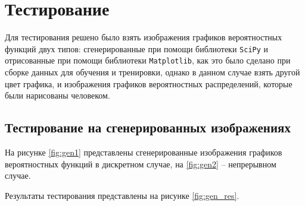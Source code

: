 \documentclass[14pt, russian]{scrartcl}
\begin{document}
\section{Тестирование}

Для тестирования решено было взять изображения графиков вероятностных функций двух типов: сгенерированные при помощи библиотеки \verb|SciPy| и отрисованные при помощи библиотеки \verb|Matplotlib|, как это было сделано при сборке данных для обучения и тренировки, однако в данном случае взять другой цвет графика, и изображения графиков вероятностных распределений, которые были нарисованы человеком.

\subsection{Тестирование на сгенерированных изображениях}

На рисунке \ref{fig:gen1} представлены сгенерированные изображения графиков вероятностных функций в дискретном случае, на \ref{fig:gen2} -- непрерывном случае.

Результаты тестирования представлены на рисунке \ref{fig:gen_res}.
\end{document}
